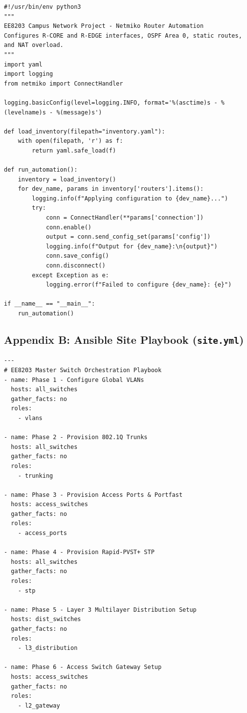 \documentclass[11pt,a4paper]{article}
\begin{document}
\begin{lstlisting}[style=pythonstyle, caption={01\_configure\_routers.py}]
#!/usr/bin/env python3
"""
EE8203 Campus Network Project - Netmiko Router Automation
Configures R-CORE and R-EDGE interfaces, OSPF Area 0, static routes, and NAT overload.
"""
import yaml
import logging
from netmiko import ConnectHandler

logging.basicConfig(level=logging.INFO, format='%(asctime)s - %(levelname)s - %(message)s')

def load_inventory(filepath="inventory.yaml"):
    with open(filepath, 'r') as f:
        return yaml.safe_load(f)

def run_automation():
    inventory = load_inventory()
    for dev_name, params in inventory['routers'].items():
        logging.info(f"Applying configuration to {dev_name}...")
        try:
            conn = ConnectHandler(**params['connection'])
            conn.enable()
            output = conn.send_config_set(params['config'])
            logging.info(f"Output for {dev_name}:\n{output}")
            conn.save_config()
            conn.disconnect()
        except Exception as e:
            logging.error(f"Failed to configure {dev_name}: {e}")

if __name__ == "__main__":
    run_automation()
\end{lstlisting}

\subsection{Appendix B: Ansible Site Playbook (\texttt{site.yml})}

\begin{lstlisting}[style=yamlstyle, caption={site.yml}]
---
# EE8203 Master Switch Orchestration Playbook
- name: Phase 1 - Configure Global VLANs
  hosts: all_switches
  gather_facts: no
  roles:
    - vlans

- name: Phase 2 - Provision 802.1Q Trunks
  hosts: all_switches
  gather_facts: no
  roles:
    - trunking

- name: Phase 3 - Provision Access Ports & Portfast
  hosts: access_switches
  gather_facts: no
  roles:
    - access_ports

- name: Phase 4 - Provision Rapid-PVST+ STP
  hosts: all_switches
  gather_facts: no
  roles:
    - stp

- name: Phase 5 - Layer 3 Multilayer Distribution Setup
  hosts: dist_switches
  gather_facts: no
  roles:
    - l3_distribution

- name: Phase 6 - Access Switch Gateway Setup
  hosts: access_switches
  gather_facts: no
  roles:
    - l2_gateway
\end{lstlisting}
\end{document}
